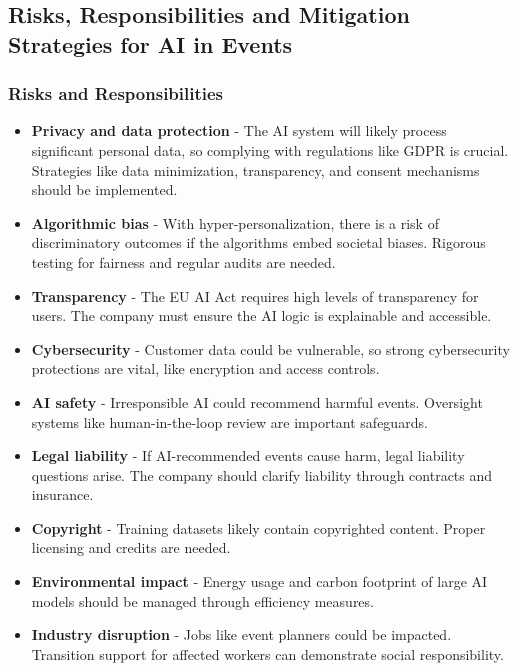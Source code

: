 \subsection{Risks, Responsibilities and Mitigation Strategies for AI in Events}

\subsubsection{Risks and Responsibilities}

\begin{itemize}
\item \textbf{Privacy and data protection} - The AI system will likely process significant personal data, so complying with regulations like GDPR is crucial. Strategies like data minimization, transparency, and consent mechanisms should be implemented.

\item \textbf{Algorithmic bias} - With hyper-personalization, there is a risk of discriminatory outcomes if the algorithms embed societal biases. Rigorous testing for fairness and regular audits are needed.

\item \textbf{Transparency} - The EU AI Act requires high levels of transparency for users. The company must ensure the AI logic is explainable and accessible.

\item \textbf{Cybersecurity} - Customer data could be vulnerable, so strong cybersecurity protections are vital, like encryption and access controls.

\item \textbf{AI safety} - Irresponsible AI could recommend harmful events. Oversight systems like human-in-the-loop review are important safeguards.

\item \textbf{Legal liability} - If AI-recommended events cause harm, legal liability questions arise. The company should clarify liability through contracts and insurance.

\item \textbf{Copyright} - Training datasets likely contain copyrighted content. Proper licensing and credits are needed.

\item \textbf{Environmental impact} - Energy usage and carbon footprint of large AI models should be managed through efficiency measures.

\item \textbf{Industry disruption} - Jobs like event planners could be impacted. Transition support for affected workers can demonstrate social responsibility.
\end{itemize}

